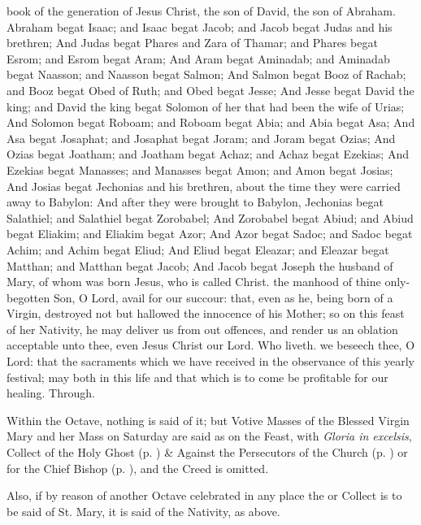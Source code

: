  book of the generation of Jesus Christ, the son of David, the son of Abraham. Abraham begat Isaac; and Isaac begat Jacob; and Jacob begat Judas and his brethren; And Judas begat Phares and Zara of Thamar; and Phares begat Esrom; and Esrom begat Aram; And Aram begat Aminadab; and Aminadab begat Naasson; and Naasson begat Salmon; And Salmon begat Booz of Rachab; and Booz begat Obed of Ruth; and Obed begat Jesse; And Jesse begat David the king; and David the king begat Solomon of her that had been the wife of Urias; And Solomon begat Roboam; and Roboam begat Abia; and Abia begat Asa; And Asa begat Josaphat; and Josaphat begat Joram; and Joram begat Ozias; And Ozias begat Joatham; and Joatham begat Achaz; and Achaz begat Ezekias; And Ezekias begat Manasses; and Manasses begat Amon; and Amon begat Josias; And Josias begat Jechonias and his brethren, about the time they were carried away to Babylon: And after they were brought to Babylon, Jechonias begat Salathiel; and Salathiel begat Zorobabel; And Zorobabel begat Abiud; and Abiud begat Eliakim; and Eliakim begat Azor; And Azor begat Sadoc; and Sadoc begat Achim; and Achim begat Eliud; And Eliud begat Eleazar; and Eleazar begat Matthan; and Matthan begat Jacob; And Jacob begat Joseph the husband of Mary, of whom was born Jesus, who is called Christ.
\secret
{} the manhood of thine only-begotten Son, O Lord, avail for our succour: that, even as he, being born of a Virgin, destroyed not but hallowed the innocence of his Mother; so on this feast of her Nativity, he may deliver us from out offences, and render us an oblation acceptable unto thee, even Jesus Christ our Lord. Who liveth.
\postcommunion
{} we beseech thee, O Lord: that the sacraments which we have received in the observance of this yearly festival; may both in this life and that which is to come be profitable for our healing. Through.

\begin{rubric}
    Within the Octave, nothing is said of it; but Votive Masses of the Blessed Virgin Mary and her Mass on Saturday are said as on the Feast, with \emph{Gloria in excelsis},  Collect of the Holy Ghost (p. \pageref{SPHolyGhost}) \&  Against the Persecutors of the Church (p. \pageref{SPAgainst}) or for the Chief Bishop (p. \pageref{SPChiefBishop}), and the Creed is omitted.
\end{rubric}
\begin{rubric}
    Also, if by reason of another Octave celebrated in any place the  or  Collect is to be said of St. Mary, it is said of the Nativity, as above.
\end{rubric}


